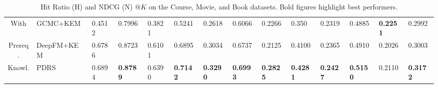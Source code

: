 \begin{table*}[t!]
{\begin{tabular}{p{0.5cm}l|llll|llll|llll}
\hline
\multicolumn{1}{c|}{With} & GCMC+KEM                                    & 0.4512                   & 0.7996                     & 0.3821                    & 0.5241                       & 0.2618                   & 0.6066                     & 0.2266                    & 0.350                       & 0.2319                   & 0.4885                     & \textbf{0.2251}           & 0.2992                      \\
\multicolumn{1}{c|}{Prereq.} & DeepFM+KEM                                  & 0.6786                   & 0.8723                     & 0.6101                    & 0.6895                       & 0.3034                   & 0.6737                     & 0.2125                    & 0.4100                       & 0.2365                   & 0.4910                     & 0.2026                    & 0.3003                      \\
\multicolumn{1}{c|}{Knowl.} & PDRS                                        & 0.6894          & \textbf{0.8789}            & 0.6390           & \textbf{0.7142}              & \textbf{0.3290}          & \textbf{0.6993}            & \textbf{0.2825}           & \textbf{0.4281}              & \textbf{0.2427}          & \textbf{0.5150}            & 0.2110                    & \textbf{0.3172}             \\ \hline
\end{tabular}
}
\caption{Hit Ratio (H) and NDCG (N) @$K$ on the Course, Movie, and Book datasets. Bold figures highlight best performers.}
\vspace{-0.3cm}
\label{tab:results}
\end{table*}

